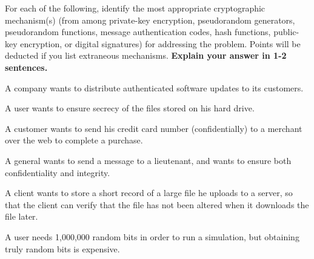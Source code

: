 \documentclass[a4paper,10pt,landscape,twocolumn]{scrartcl}
\begin{document}
\begin{exercise}
For each of the following, identify the most appropriate cryptographic
mechanism(s) (from among private-key encryption, pseudorandom generators, pseudorandom functions, message authentication codes, hash functions, public-key encryption, or digital signatures) for addressing the problem. Points will be deducted if you
list extraneous mechanisms. \textbf{Explain your answer in 1-2 sentences.}
\begin{subex}
A company wants to distribute authenticated software updates to its customers.
\end{subex}
\begin{subex}
A user wants to ensure secrecy of the files stored on his hard drive.
\end{subex}
\begin{subex}
A customer wants to send his credit card number (confidentially) to a merchant
over the web to complete a purchase.
\end{subex}
\begin{subex}
A general wants to send a message to a lieutenant, and wants to ensure both
confidentiality and integrity.
\end{subex}
\begin{subex}
A client wants to store a short record of a large file he uploads to a server, so that
the client can verify that the file has not been altered when it downloads the file
later.
\end{subex}
\begin{subex}
A user needs 1,000,000 random bits in order to run a simulation, but obtaining
truly random bits is expensive.
\end{subex}
\end{exercise}
\end{document}
